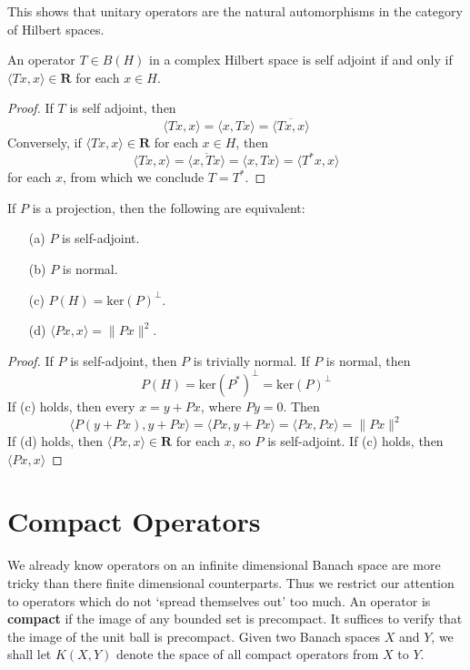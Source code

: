 This shows that unitary operators are the natural automorphisms in the category of Hilbert spaces.

\begin{lemma}
    An operator $T \in B(H)$ in a complex Hilbert space is self adjoint if and only if $\langle Tx, x \rangle \in \mathbf{R}$ for each $x \in H$.
\end{lemma}
\begin{proof}
    If $T$ is self adjoint, then
    \[ \langle Tx, x \rangle = \langle x, Tx \rangle = \overline{\langle Tx, x \rangle} \]
    Conversely, if $\langle Tx, x \rangle \in \mathbf{R}$ for each $x \in H$, then
    \[ \langle Tx, x \rangle = \overline{\langle x, Tx \rangle} = \langle x, Tx \rangle = \langle T^*x, x \rangle \]
    for each $x$, from which we conclude $T = T^*$.
\end{proof}

\begin{theorem}
    If $P$ is a projection, then the following are equivalent:
    \begin{enumerate}
        \item[(a)] $P$ is self-adjoint.
        \item[(b)] $P$ is normal.
        \item[(c)] $P(H) = \text{ker}(P)^\perp$.
        \item[(d)] $\langle Px, x \rangle = \| Px \|^2$.
    \end{enumerate}
\end{theorem}
\begin{proof}
    If $P$ is self-adjoint, then $P$ is trivially normal. If $P$ is normal, then
    \[ P(H) = \text{ker}(P^*)^\perp = \text{ker}(P)^\perp \]
    If (c) holds, then every $x = y + Px$, where $Py = 0$. Then
    \[ \langle P(y + Px), y + Px \rangle = \langle Px, y + Px \rangle = \langle Px, Px \rangle = \| Px \|^2 \]
    If (d) holds, then $\langle Px, x \rangle \in \mathbf{R}$ for each $x$, so $P$ is self-adjoint. If (c) holds, then $\langle Px, x \rangle$
\end{proof}






\section{Compact Operators}

We already know operators on an infinite dimensional Banach space are more tricky than there finite dimensional counterparts. Thus we restrict our attention to operators which do not `spread themselves out' too much. An operator is {\bf compact} if the image of any bounded set is precompact. It suffices to verify that the image of the unit ball is precompact. Given two Banach spaces $X$ and $Y$, we shall let $K(X,Y)$ denote the space of all compact operators from $X$ to $Y$.

